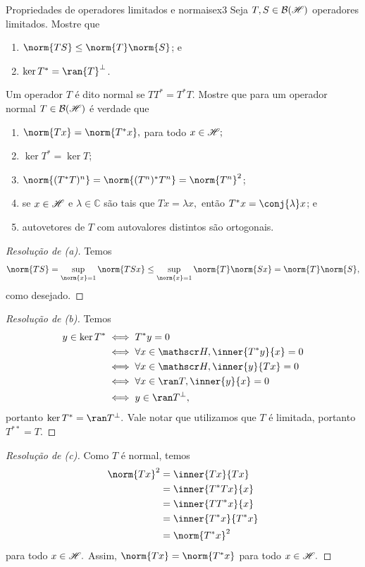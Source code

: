 \begin{exercício}{Propriedades de operadores limitados e normais}{ex3}
  Seja \(T, S \in \mathcal{B}(\mathscr{H})\) operadores limitados. Mostre que
  \begin{enumerate}[label=(\alph*)]
    \item \(\norm{TS} \leq \norm{T}\norm{S}\); e
    \item \(\ker{T^*} = \ran{T}^\perp\).
  \end{enumerate}
  Um operador \(T\) é dito normal se \(T T^* = T^* T.\) Mostre que para um operador normal \(T \in \mathcal{B}(\mathscr{H})\) é verdade que
  \begin{enumerate}[label=(\alph*), start=3]
    \item \(\norm{Tx} = \norm{T^*x},\) para todo \(x \in \mathscr{H};\)
    \item \(\ker{T^*} = \ker{T}\);
    \item \(\norm{(T^*T)^n} = \norm{(T^n)^*T^n} = \norm{T^n}^2\);
    \item se \(x \in \mathscr{H}\) e \(\lambda \in \mathbb{C}\) são tais que \(Tx = \lambda x,\) então \(T^*x = \conj{\lambda} x\); e
    \item autovetores de \(T\) com autovalores distintos são ortogonais.
  \end{enumerate}
\end{exercício}
\begin{proof}[Resolução de (a)]
  Temos
  \begin{equation*}
    \norm{TS} = \sup_{\norm{x} = 1}{\norm{TSx}} \leq \sup_{\norm{x} = 1}{\norm{T} \norm{Sx}} = \norm{T} \norm{S},
  \end{equation*}
  como desejado.
\end{proof}
\begin{proof}[Resolução de (b)]
  Temos
  \begin{align*}
    y \in \ker T^* &\iff T^*y = 0\\
                   &\iff \forall x \in \hilbert, \inner{T^*y}{x} = 0\\
                   &\iff \forall x \in \hilbert, \inner{y}{Tx} = 0\\
                   &\iff \forall x \in \ran T, \inner{y}{x} = 0\\
                   &\iff y \in \ran T^\perp,
  \end{align*}
  portanto \(\ker T^* = \ran T^\perp.\) Vale notar que utilizamos que \(T\) é limitada, portanto \(T^{**} = T\).
\end{proof}
\begin{proof}[Resolução de (c)]
  Como \(T\) é normal, temos
  \begin{align*}
    \norm{Tx}^2 &= \inner{Tx}{Tx}\\
                            &= \inner{T^*Tx}{x}\\
                            &= \inner{T T^*x}{x}\\
                            &= \inner{T^*x}{T^*x}\\
                            &= \norm{T^*x}^2
  \end{align*}
  para todo \(x \in \mathscr{H}.\) Assim, \(\norm{Tx} = \norm{T^*x}\) para todo \(x \in \mathscr{H}.\)
\end{proof}
